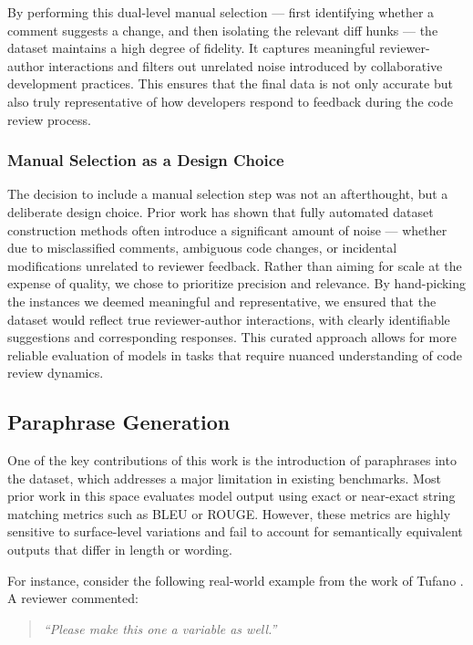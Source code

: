 By performing this dual-level manual selection — first identifying whether a comment suggests a
change, and then isolating the relevant diff hunks — the dataset maintains a high degree of
fidelity. It captures meaningful reviewer-author interactions and filters out unrelated noise
introduced by collaborative development practices. This ensures that the final data is not only
accurate but also truly representative of how developers respond to feedback during the code review
process.

\subsubsection{Manual Selection as a Design Choice}

The decision to include a manual selection step was not an afterthought, but a deliberate design
choice. Prior work has shown that fully automated dataset construction methods often introduce a
significant amount of noise — whether due to misclassified comments, ambiguous code changes, or
incidental modifications unrelated to reviewer feedback. Rather than aiming for scale at the expense
of quality, we chose to prioritize precision and relevance. By hand-picking the instances we deemed
meaningful and representative, we ensured that the dataset would reflect true reviewer-author
interactions, with clearly identifiable suggestions and corresponding responses. This curated
approach allows for more reliable evaluation of models in tasks that require nuanced understanding
of code review dynamics.

\subsection{Paraphrase Generation}
\label{sec:paraphrases}

One of the key contributions of this work is the introduction of paraphrases into the dataset, which
addresses a major limitation in existing benchmarks. Most prior work in this space evaluates model
output using exact or near-exact string matching metrics such as BLEU or ROUGE. However, these
metrics are highly sensitive to surface-level variations and fail to account for semantically
equivalent outputs that differ in length or wording.

For instance, consider the following real-world example from the work of Tufano \etal
\cite{tufano:icse2022}. A reviewer commented:

\begin{quote}
	\textit{“Please make this one a variable as well.”}
\end{quote}

